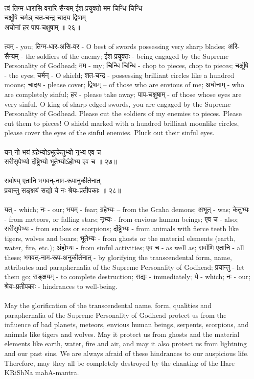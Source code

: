 \\ 
त्वं तिग्म-धारासि-वरारि-सैन्यम् ईश-प्रयुक्तो मम चिन्धि चिन्धि\\
चक्षूंषि चर्मञ् चत-चन्द्र चादय द्विषाम्\\
अघोनां हर पाप-चक्षुषाम् ॥ २६॥\\
\\
त्वम् - you;  तिग्म-धार-असि-वर - O best of swords possessing very sharp blades;  अरि-सैन्यम् - the soldiers of the enemy;  ईश-प्रयुक्तः - being engaged by the Supreme Personality of Godhead;  मम - my;  चिन्धि चिन्धि -  chop to pieces, chop to pieces;  चक्षूंषि - the eyes; चर्मन् - O shield;  शत-चन्द्र - possessing brilliant circles like a hundred moons;  चादय - please cover;  द्विषाम् – of those who are envious of me;  अघोनाम् - who are completely sinful;  हर - please take away;  पाप-चक्षुषाम् - of those whose eyes are very sinful.  O king of sharp-edged swords, you are engaged by the Supreme Personality of Godhead. Please cut the soldiers of my enemies to pieces. Please cut them to pieces! O shield marked with a hundred brilliant moonlike circles, please cover the eyes of the sinful enemies. Pluck out their sinful eyes.\\
\\
यन् नो भयं ग्रहेभ्योऽभूत्केतुभ्यो नृभ्य एव च\\
सरीसृपेभ्यो दंष्ट्रिभ्यो भूतेभ्योऽंहोभ्य एव च ॥ २७॥\\
\\
सर्वाण्य् एतानि भगवन्-नाम-रूपानुकीर्तनात्\\
प्रयान्तु सङ्क्षयं सद्यो ये नः श्रेयः-प्रतीपकाः ॥ २८॥\\
\\
यत् - which;  नः - our;  भयम् - fear;  ग्रहेभ्यः – from the Graha demons;  अभूत् - was;  केतुभ्यः - from meteors, or falling stars;  नृभ्यः - from envious human beings;  एव च - also;  सरीसृपेभ्यः - from snakes or scorpions;  दंष्ट्रिभ्यः - from animals with fierce teeth like tigers, wolves and boars; भूतेभ्यः  - from ghosts or the material elements (earth, water, fire, etc.);  अंहोभ्यः - from sinful activities;  एव च - as well as; सर्वाणि एतानि - all these;  भगवत्-नाम-रूप-अनुकीर्तनात् - by glorifying the transcendental form, name, attributes and paraphernalia of the Supreme Personality of Godhead;  प्रयान्तु - let them go; सङ्क्षयम् - to complete destruction;  सद्यः - immediately; ये - which;  नः - our;  श्रेयः-प्रतीपकाः - hindrances to well-being.\\
\\
May the glorification of the transcendental name, form, qualities and paraphernalia of the Supreme Personality of Godhead protect us from the influence of bad planets, meteors, envious human beings, serpents, scorpions, and animals like tigers and wolves. May it protect us from ghosts and the material elements like earth, water, fire and air, and may it also protect us from lightning and our past sins. We are always afraid of these hindrances to our auspicious life. Therefore, may they all be completely destroyed by the chanting of the Hare KRiShNa mahA-mantra.\\
